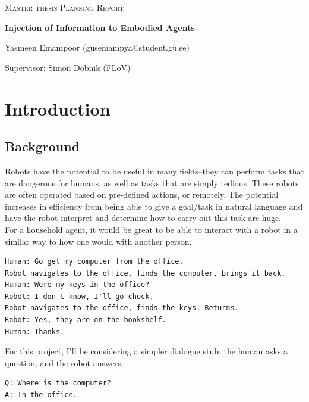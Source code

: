 \documentclass{article}
\begin{document}
\begin{titlepage}
  

\centering
  
  
{\scshape\LARGE Master thesis Planning Report\\}
  
\vspace{0.5cm}
  
{\huge\bfseries Injection of Information to Embodied Agents\\}

  
\vspace{2cm}
  
{\Large Yasmeen Emampoor (gusemampya@student.gu.se)\\}
  
\vspace{1.0cm}
  
{\large Supervisor: Simon Dobnik (FLoV)\\}
  
\vspace{1.5cm}

\end{titlepage}
  
\section{Introduction}
\subsection{Background}

Robots have the potential to be useful in many fields–they can perform tasks
that are dangerous for humans, as well as tasks that are simply tedious. These
robots are often operated based on pre-defined actions, or remotely. The potential increases in efficiency from being able to give a goal/task in natural language and have the robot interpret and determine how to carry out this task are huge. \\
For a household agent, it would be great to be able to interact with a robot in a similar way to how one would with another person. 
\begin{verbatim}
Human: Go get my computer from the office. 
Robot navigates to the office, finds the computer, brings it back. 
Human: Were my keys in the office?
Robot: I don't know, I'll go check. 
Robot navigates to the office, finds the keys. Returns.
Robot: Yes, they are on the bookshelf. 
Human: Thanks. 
\end{verbatim}
For this project, I'll be considering a simpler dialogue stub: the human asks a question, and the robot answers. 
\begin{verbatim}
Q: Where is the computer?
A: In the office. 
\end{verbatim}
\end{document}
